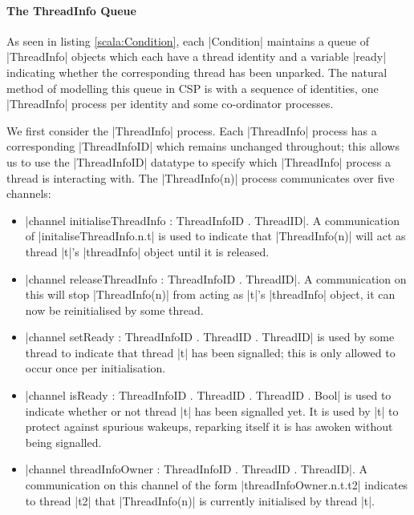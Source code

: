 


\paragraph{The ThreadInfo Queue}\label{section:ThreadInfo}

As seen in listing \ref{scala:Condition}, each |Condition| maintains a queue of |ThreadInfo| objects which each have a thread identity and a variable |ready| indicating whether the corresponding thread has been unparked. The natural method of modelling this queue in CSP is with a sequence of identities, one |ThreadInfo| process per identity and some co-ordinator processes.

We first consider the |ThreadInfo| process. Each |ThreadInfo| process has a corresponding |ThreadInfoID| which remains unchanged throughout; this allows us to use the |ThreadInfoID| datatype to specify which |ThreadInfo| process a thread is interacting with. The |ThreadInfo(n)| process communicates over five channels:

\begin{itemize}
  \item |channel initialiseThreadInfo : ThreadInfoID . ThreadID|. A communication of |initaliseThreadInfo.n.t| is used to indicate that |ThreadInfo(n)| will act as thread |t|'s |threadInfo| object until it is released.
  \item |channel releaseThreadInfo : ThreadInfoID . ThreadID|. A communication on this will stop |ThreadInfo(n)| from acting as |t|'s |threadInfo| object, it can now be reinitialised by some thread.
  \item |channel setReady : ThreadInfoID . ThreadID . ThreadID| is used by some thread to indicate that thread |t| has been signalled; this is only allowed to occur once per initialisation.
  \item |channel isReady : ThreadInfoID . ThreadID . ThreadID . Bool| is used to indicate whether or not thread |t| has been signalled yet. It is used by |t| to protect against spurious wakeups, reparking itself it is has awoken without being signalled.
  \item |channel threadInfoOwner : ThreadInfoID . ThreadID . ThreadID|. A communication on this channel of the form |threadInfoOwner.n.t.t2| indicates to thread |t2| that |ThreadInfo(n)| is currently initialised by thread |t|.
\end{itemize}

